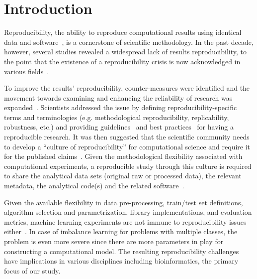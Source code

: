 \chapter{Introduction}
Reproducibility, the ability to reproduce computational results using identical data 
and software~\cite{peng2011reproducible}, is a cornerstone of scientific methodology. 
In the past decade, however, several studies revealed a widespread lack of results 
reproducibility, to the point that the existence of a reproducibility crisis is 
now acknowledged in various fields~\cite{baker_1500_2016}.


To improve the results’ reproducibility, counter-measures were identified and the movement 
towards examining and enhancing the reliability of research was expanded~\cite{begley2015reproducibility}.  
Scientists addressed the issue by defining reproducibility-specific terms and terminologies 
(e.g. methodological reproducibility, replicability, robustness, etc.)
and providing guidelines~\cite{cacioppo_social_2015,goodman_what_2016} and 
best practices~\cite{nichols2017best,sandve2013ten} 
for having a reproducible research.  It was then suggested that the scientific community 
needs to develop a “culture of reproducibility” for computational science and require it for the 
published claims~\cite{peng_reproducible_2011}. Given the methodological flexibility associated with 
computational experiments, a reproducible study through this culture is required to 
share the analytical data sets (original raw or processed data), 
the relevant metadata, the analytical code(s) and the related software~\cite{wilkinson2016fair}. 

Given the available flexibility in
data pre-processing, train/test set definitions, algorithm selection and
parametrization, library implementations, and evaluation metrics, machine learning experiments 
are not immune to reproducibility issues either~\cite{raff2019step}. 
In case of imbalance learning for problems with multiple classes, 
the problem is even more severe since there are more parameters in play for constructing 
a computational model. The resulting reproducibility challenges have implications in various
disciplines including bioinformatics, the primary focus of our study.

